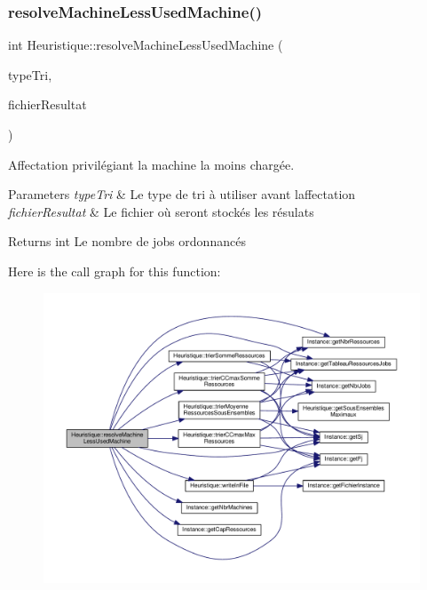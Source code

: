 \subsubsection{\texorpdfstring{resolve\+Machine\+Less\+Used\+Machine()}{resolveMachineLessUsedMachine()}}
{\footnotesize\ttfamily int Heuristique\+::resolve\+Machine\+Less\+Used\+Machine (\begin{DoxyParamCaption}\item[{Q\+String}]{type\+Tri,  }\item[{Q\+String}]{fichier\+Resultat }\end{DoxyParamCaption})}



Affectation privilégiant la machine la moins chargée. 


\begin{DoxyParams}{Parameters}
{\em type\+Tri} & Le type de tri à utiliser avant l\textquotesingle{}affectation \\
\hline
{\em fichier\+Resultat} & Le fichier où seront stockés les résulats \\
\hline
\end{DoxyParams}
\begin{DoxyReturn}{Returns}
int Le nombre de jobs ordonnancés 
\end{DoxyReturn}
Here is the call graph for this function\+:\nopagebreak
\begin{figure}[H]
\begin{center}
\leavevmode
\includegraphics[width=350pt]{classHeuristique_aa590500fc2368d1ea58ab483b2377fea_cgraph}
\end{center}
\end{figure}
\mbox{\label{classHeuristique_a49b20cab1a9055fddf0519fe7bf99c4a}} 
